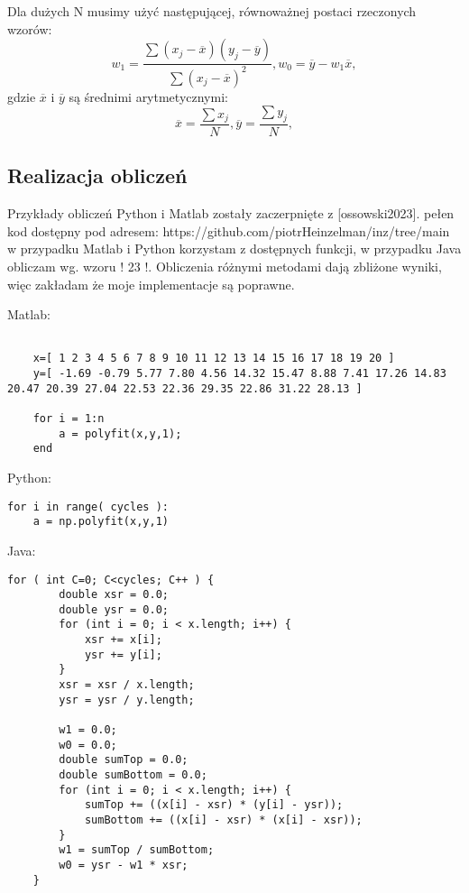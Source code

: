 Dla dużych N\cite{russell2023} musimy użyć następującej, równoważnej postaci rzeczonych wzorów:
\begin{equation}
w_1=\frac{ \sum (x_j-\overline{x})( y_j - \overline{y}  )  }{ \sum ( x_j - \overline{x} )^2 }, 
w_0=\overline y - w_1\overline x,
\end{equation}
gdzie \(\overline{x}\) i \(\overline{y} \) są średnimi arytmetycznymi: 
\begin{equation}
\overline{x}=\frac{\sum x_j}{N}, \overline{y}=\frac{\sum y_j}{N},
\end{equation}


\subsection{Realizacja obliczeń}
Przykłady obliczeń Python i Matlab zostały zaczerpnięte z [ossowski2023].
pełen kod dostępny pod adresem: https://github.com/piotrHeinzelman/inz/tree/main
w przypadku Matlab i Python korzystam z dostępnych funkcji, w przypadku Java obliczam wg. wzoru ! 23 !. Obliczenia różnymi metodami dają zbliżone wyniki, więc zakładam że moje implementacje są poprawne. 

Matlab: 
\begin{lstlisting}

    x=[ 1 2 3 4 5 6 7 8 9 10 11 12 13 14 15 16 17 18 19 20 ]
    y=[ -1.69 -0.79 5.77 7.80 4.56 14.32 15.47 8.88 7.41 17.26 14.83 20.47 20.39 27.04 22.53 22.36 29.35 22.86 31.22 28.13 ]

    for i = 1:n
        a = polyfit(x,y,1);
    end
\end{lstlisting}

Python: 
\begin{lstlisting}
for i in range( cycles ):
    a = np.polyfit(x,y,1)
\end{lstlisting}

Java:
\begin{lstlisting}
for ( int C=0; C<cycles; C++ ) {
        double xsr = 0.0;
        double ysr = 0.0;
        for (int i = 0; i < x.length; i++) {
            xsr += x[i];
            ysr += y[i];
        }
        xsr = xsr / x.length;
        ysr = ysr / y.length;

        w1 = 0.0;
        w0 = 0.0;
        double sumTop = 0.0;
        double sumBottom = 0.0;
        for (int i = 0; i < x.length; i++) {
            sumTop += ((x[i] - xsr) * (y[i] - ysr));
            sumBottom += ((x[i] - xsr) * (x[i] - xsr));
        }
        w1 = sumTop / sumBottom;
        w0 = ysr - w1 * xsr;
    }
\end{lstlisting}

